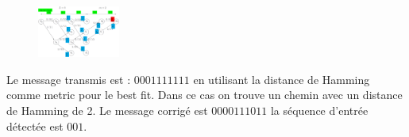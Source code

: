 \begin{figure}
    \includegraphics[width=0.24\textwidth]{images/conv_coding_viterbi_3.png}
\end{figure}
Le message transmis est : $00 01 11 11 11$ en utilisant la distance de Hamming comme metric pour
le best fit. Dans ce cas on trouve un chemin avec un distance de Hamming de 2. Le message corrigé est
$00 00 11 10 11$ la séquence d'entrée détectée est $001$.\\






